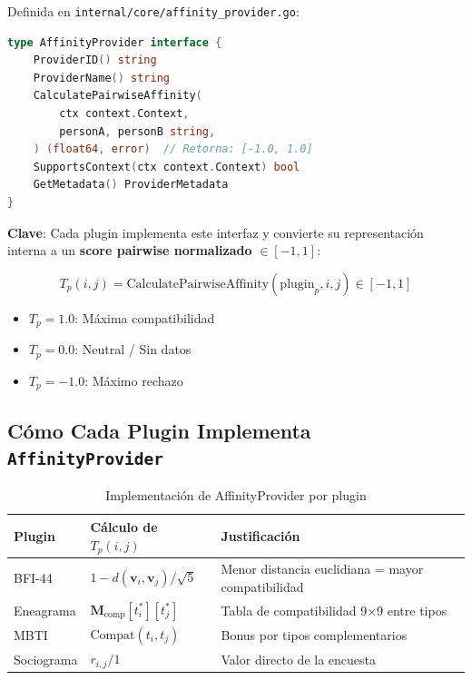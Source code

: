 \documentclass[12pt,a4paper]{article}
\begin{document}
Definida en \texttt{internal/core/affinity\_provider.go}:

\begin{lstlisting}[language=Go]
type AffinityProvider interface {
    ProviderID() string
    ProviderName() string
    CalculatePairwiseAffinity(
        ctx context.Context, 
        personA, personB string,
    ) (float64, error)  // Retorna: [-1.0, 1.0]
    SupportsContext(ctx context.Context) bool
    GetMetadata() ProviderMetadata
}
\end{lstlisting}

\textbf{Clave}: Cada plugin implementa este interfaz y convierte su representación interna a un \textbf{score pairwise normalizado} $\in [-1, 1]$:

\[
T_p(i, j) = \text{CalculatePairwiseAffinity}(\text{plugin}_p, i, j) \in [-1, 1]
\]

\begin{itemize}
    \item $T_p = 1.0$: Máxima compatibilidad
    \item $T_p = 0.0$: Neutral / Sin datos
    \item $T_p = -1.0$: Máximo rechazo
\end{itemize}

\subsection{Cómo Cada Plugin Implementa \texttt{AffinityProvider}}

\begin{table}[h]
\centering
\small
\begin{tabular}{llp{5cm}}
\toprule
\textbf{Plugin} & \textbf{Cálculo de $T_p(i,j)$} & \textbf{Justificación} \\
\midrule
BFI-44 & $1 - d(\mathbf{v}_i, \mathbf{v}_j) / \sqrt{5}$ & Menor distancia euclidiana = mayor compatibilidad \\
Eneagrama & $\mathbf{M}_{\text{comp}}[t^*_i][t^*_j]$ & Tabla de compatibilidad 9$\times$9 entre tipos \\
MBTI & $\text{Compat}(t_i, t_j)$ & Bonus por tipos complementarios \\
Sociograma & $r_{i,j} / 1$ & Valor directo de la encuesta \\
\bottomrule
\end{tabular}
\caption{Implementación de AffinityProvider por plugin}
\end{table}

\end{document}
